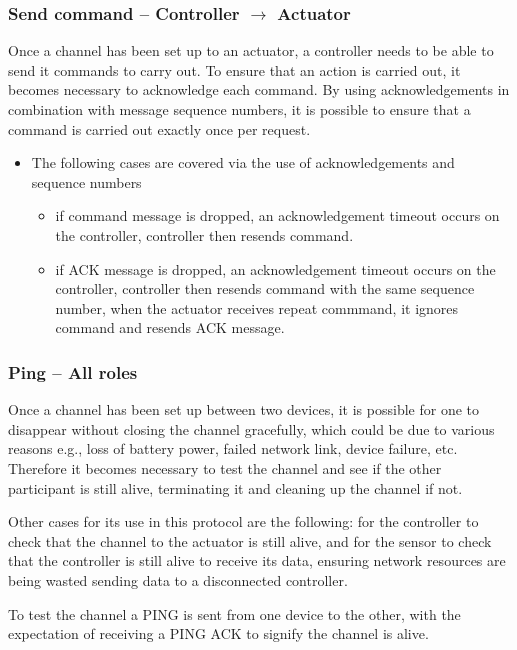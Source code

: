 \subsubsection{Send command -- Controller $\rightarrow$ Actuator} %
\label{ssub:send_command}
Once a channel has been set up to an actuator, a controller needs to be able to send it commands to carry out. To ensure that an action is carried out, it becomes necessary to acknowledge each command. By using acknowledgements in combination with message sequence numbers, it is possible to ensure that a command is carried out exactly once per request.

\begin{itemize}
	\item The following cases are covered via the use of acknowledgements and sequence numbers
	\begin{itemize}
		\item if command message is dropped, an acknowledgement timeout occurs on the controller, controller then resends command.
		\item if ACK message is dropped, an acknowledgement timeout occurs on the controller, controller then resends command with the same sequence number, when the actuator receives repeat commmand, it ignores command and resends ACK message.
	\end{itemize}
\end{itemize}


\subsubsection{Ping -- All roles} %
\label{ssub:ping}
Once a channel has been set up between two devices, it is possible for one to disappear without closing the channel gracefully, which could be due to various reasons e.g., loss of battery power, failed network link, device failure, etc. Therefore it becomes necessary to test the channel and see if the other participant is still alive, terminating it and cleaning up the channel if not.

Other cases for its use in this protocol are the following: for the controller to check that the channel to the actuator is still alive, and for the sensor to check that the controller is still alive to receive its data, ensuring network resources are being wasted sending data to a disconnected controller.

To test the channel a PING is sent from one device to the other, with the expectation of receiving a PING ACK to signify the channel is alive.

